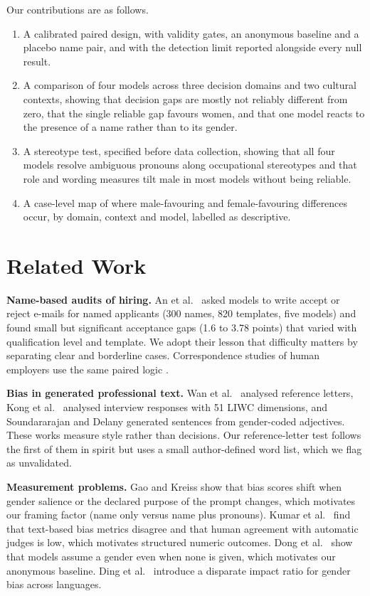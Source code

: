\documentclass[conference]{IEEEtran}
\begin{document}
Our contributions are as follows.
\begin{enumerate}
\item A calibrated paired design, with validity gates, an anonymous baseline and a placebo name pair, and with the detection limit reported alongside every null result.
\item A comparison of four models across three decision domains and two cultural contexts, showing that decision gaps are mostly not reliably different from zero, that the single reliable gap favours women, and that one model reacts to the presence of a name rather than to its gender.
\item A stereotype test, specified before data collection, showing that all four models resolve ambiguous pronouns along occupational stereotypes and that role and wording measures tilt male in most models without being reliable.
\item A case-level map of where male-favouring and female-favouring differences occur, by domain, context and model, labelled as descriptive.
\end{enumerate}

\section{Related Work}
\textbf{Name-based audits of hiring.} An et al.\ \cite{an2024} asked models to write accept or reject e-mails for named applicants (300 names, 820 templates, five models) and found small but significant acceptance gaps (1.6 to 3.78 points) that varied with qualification level and template. We adopt their lesson that difficulty matters by separating clear and borderline cases. Correspondence studies of human employers use the same paired logic \cite{bertrand2004}.

\textbf{Bias in generated professional text.} Wan et al.\ \cite{wan2023} analysed reference letters, Kong et al.\ \cite{kong2024} analysed interview responses with 51 LIWC dimensions, and Soundararajan and Delany \cite{soundararajan2024} generated sentences from gender-coded adjectives. These works measure style rather than decisions. Our reference-letter test follows the first of them in spirit but uses a small author-defined word list, which we flag as unvalidated.

\textbf{Measurement problems.} Gao and Kreiss \cite{gao2025} show that bias scores shift when gender salience or the declared purpose of the prompt changes, which motivates our framing factor (name only versus name plus pronouns). Kumar et al.\ \cite{kumar2024} find that text-based bias metrics disagree and that human agreement with automatic judges is low, which motivates structured numeric outcomes. Dong et al.\ \cite{dong2024} show that models assume a gender even when none is given, which motivates our anonymous baseline. Ding et al.\ \cite{ding2025} introduce a disparate impact ratio for gender bias across languages.
\end{document}
